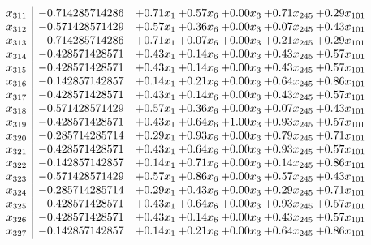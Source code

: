 \documentclass[8pt]{article}
\begin{document}
\[\begin{array}{c| c c@{\hskip 2pt} c@{\hskip 2pt} c@{\hskip 2pt} c@{\hskip 2pt} c@{\hskip 2pt} }
 x_{311}   &  -0.714285714286 & +  0.71 x_{1} & +  0.57 x_{6} & +  0.00 x_{3} & +  0.71 x_{245} & +  0.29 x_{101}\\
 x_{312}   &  -0.571428571429 & +  0.57 x_{1} & +  0.36 x_{6} & +  0.00 x_{3} & +  0.07 x_{245} & +  0.43 x_{101}\\
 x_{313}   &  -0.714285714286 & +  0.71 x_{1} & +  0.07 x_{6} & +  0.00 x_{3} & +  0.21 x_{245} & +  0.29 x_{101}\\
 x_{314}   &  -0.428571428571 & +  0.43 x_{1} & +  0.14 x_{6} & +  0.00 x_{3} & +  0.43 x_{245} & +  0.57 x_{101}\\
 x_{315}   &  -0.428571428571 & +  0.43 x_{1} & +  0.14 x_{6} & +  0.00 x_{3} & +  0.43 x_{245} & +  0.57 x_{101}\\
 x_{316}   &  -0.142857142857 & +  0.14 x_{1} & +  0.21 x_{6} & +  0.00 x_{3} & +  0.64 x_{245} & +  0.86 x_{101}\\
 x_{317}   &  -0.428571428571 & +  0.43 x_{1} & +  0.14 x_{6} & +  0.00 x_{3} & +  0.43 x_{245} & +  0.57 x_{101}\\
 x_{318}   &  -0.571428571429 & +  0.57 x_{1} & +  0.36 x_{6} & +  0.00 x_{3} & +  0.07 x_{245} & +  0.43 x_{101}\\
 x_{319}   &  -0.428571428571 & +  0.43 x_{1} & +  0.64 x_{6} & +  1.00 x_{3} & +  0.93 x_{245} & +  0.57 x_{101}\\
 x_{320}   &  -0.285714285714 & +  0.29 x_{1} & +  0.93 x_{6} & +  0.00 x_{3} & +  0.79 x_{245} & +  0.71 x_{101}\\
 x_{321}   &  -0.428571428571 & +  0.43 x_{1} & +  0.64 x_{6} & +  0.00 x_{3} & +  0.93 x_{245} & +  0.57 x_{101}\\
 x_{322}   &  -0.142857142857 & +  0.14 x_{1} & +  0.71 x_{6} & +  0.00 x_{3} & +  0.14 x_{245} & +  0.86 x_{101}\\
 x_{323}   &  -0.571428571429 & +  0.57 x_{1} & +  0.86 x_{6} & +  0.00 x_{3} & +  0.57 x_{245} & +  0.43 x_{101}\\
 x_{324}   &  -0.285714285714 & +  0.29 x_{1} & +  0.43 x_{6} & +  0.00 x_{3} & +  0.29 x_{245} & +  0.71 x_{101}\\
 x_{325}   &  -0.428571428571 & +  0.43 x_{1} & +  0.64 x_{6} & +  0.00 x_{3} & +  0.93 x_{245} & +  0.57 x_{101}\\
 x_{326}   &  -0.428571428571 & +  0.43 x_{1} & +  0.14 x_{6} & +  0.00 x_{3} & +  0.43 x_{245} & +  0.57 x_{101}\\
 x_{327}   &  -0.142857142857 & +  0.14 x_{1} & +  0.21 x_{6} & +  0.00 x_{3} & +  0.64 x_{245} & +  0.86 x_{101}\\

\end{array}\]
\end{document}
